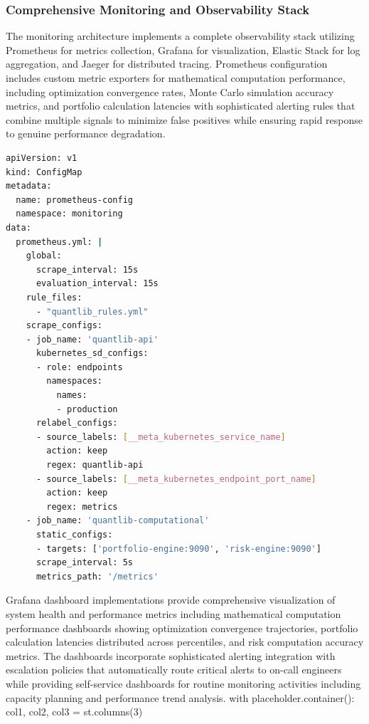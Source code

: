 \documentclass[12pt,a4paper]{article}
\theoremstyle{definition}
\theoremstyle{remark}
\begin{document}
\subsubsection{Comprehensive Monitoring and Observability Stack}

The monitoring architecture implements a complete observability stack utilizing Prometheus for metrics collection, Grafana for visualization, Elastic Stack for log aggregation, and Jaeger for distributed tracing. Prometheus configuration includes custom metric exporters for mathematical computation performance, including optimization convergence rates, Monte Carlo simulation accuracy metrics, and portfolio calculation latencies with sophisticated alerting rules that combine multiple signals to minimize false positives while ensuring rapid response to genuine performance degradation.

\begin{lstlisting}[caption=Prometheus Monitoring Configuration,language=bash]
apiVersion: v1
kind: ConfigMap
metadata:
  name: prometheus-config
  namespace: monitoring
data:
  prometheus.yml: |
    global:
      scrape_interval: 15s
      evaluation_interval: 15s
    rule_files:
      - "quantlib_rules.yml"
    scrape_configs:
    - job_name: 'quantlib-api'
      kubernetes_sd_configs:
      - role: endpoints
        namespaces:
          names:
          - production
      relabel_configs:
      - source_labels: [__meta_kubernetes_service_name]
        action: keep
        regex: quantlib-api
      - source_labels: [__meta_kubernetes_endpoint_port_name]
        action: keep
        regex: metrics
    - job_name: 'quantlib-computational'
      static_configs:
      - targets: ['portfolio-engine:9090', 'risk-engine:9090']
      scrape_interval: 5s
      metrics_path: '/metrics'
\end{lstlisting}

Grafana dashboard implementations provide comprehensive visualization of system health and performance metrics including mathematical computation performance dashboards showing optimization convergence trajectories, portfolio calculation latencies distributed across percentiles, and risk computation accuracy metrics. The dashboards incorporate sophisticated alerting integration with escalation policies that automatically route critical alerts to on-call engineers while providing self-service dashboards for routine monitoring activities including capacity planning and performance trend analysis.
        with placeholder.container():
            col1, col2, col3 = st.columns(3)
            
\end{document}
